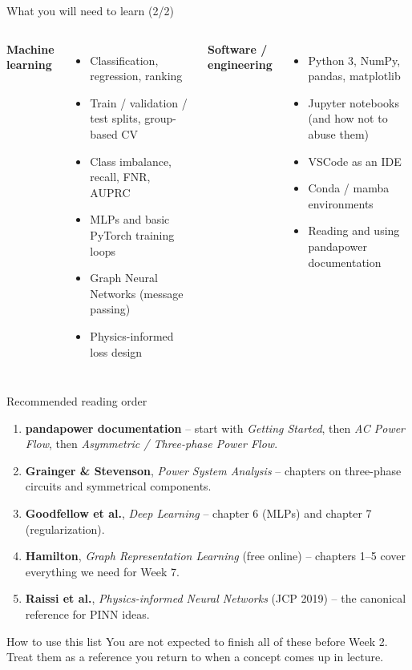 \documentclass[aspectratio=169,10pt]{beamer}
\begin{document}
\begin{frame}{What you will need to learn (2/2)}
\begin{columns}[T]
\textbf{Machine learning}
\begin{itemize}
  \item Classification, regression, ranking
  \item Train / validation / test splits, group-based CV
  \item Class imbalance, recall, FNR, AUPRC
  \item MLPs and basic PyTorch training loops
  \item Graph Neural Networks (message passing)
  \item Physics-informed loss design
\end{itemize}
\textbf{Software / engineering}
\begin{itemize}
  \item Python 3, NumPy, pandas, matplotlib
  \item Jupyter notebooks (and how not to abuse them)
  \item VSCode as an IDE
  \item Conda / mamba environments
  \item Reading and using pandapower documentation
\end{itemize}
\end{columns}
\end{frame}

\begin{frame}{Recommended reading order}
\footnotesize
\begin{enumerate}
  \item \textbf{pandapower documentation} -- start with \emph{Getting Started}, then \emph{AC Power Flow}, then \emph{Asymmetric / Three-phase Power Flow}.
  \item \textbf{Grainger \& Stevenson}, \emph{Power System Analysis} -- chapters on three-phase circuits and symmetrical components.
  \item \textbf{Goodfellow et al.}, \emph{Deep Learning} -- chapter 6 (MLPs) and chapter 7 (regularization).
  \item \textbf{Hamilton}, \emph{Graph Representation Learning} (free online) -- chapters 1--5 cover everything we need for Week 7.
  \item \textbf{Raissi et al.}, \emph{Physics-informed Neural Networks} (JCP 2019) -- the canonical reference for PINN ideas.
\end{enumerate}
\begin{block}{How to use this list}
You are not expected to finish all of these before Week 2. Treat them as a reference you return to when a concept comes up in lecture.
\end{block}
\end{frame}
\end{document}

